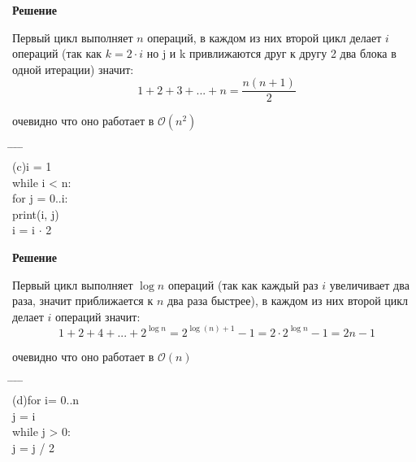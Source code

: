 \documentclass{article}
\begin{document}
\textbf{Решение}

Первый цикл выполняет $n$ операций, в каждом из них второй цикл делает $i$ операций (так как 
$k = 2\cdot i$ но j и k привлижаются друг к другу 2 два блока в одной итерации) значит:
\begin{equation*}
    1+2+3+...+n = \dfrac{n(n + 1)}{2}
\end{equation*}

очевидно что оно работает в $\mathcal{O}(n^2)$

\begin{tabbing}
    \hspace{0.5 cm} \= \hspace{0.5 cm}  \= \hspace{0.5 cm} \= \hspace{0.5 cm} \= \hspace{0.5 cm}\\
\> (c)i = 1\\
\>\>while i < n:\\
\>\>\>for j = 0..i:\\
\>\>\>\>print(i, j)\\
\>\>\>i = i $\cdot$  2
\end{tabbing}

\textbf{Решение}

Первый цикл выполняет $\log n$ операций (так как каждый раз $i$ увеличивает два раза, значит приближается к $n$ два раза быстрее),
 в каждом из них второй цикл делает $i$ операций значит:
\begin{equation*}
    1+2+4+...+2^{\log n} = 2^{\log (n) + 1} - 1 = 2\cdot 2^{\log n} - 1 = 2n - 1
\end{equation*}

очевидно что оно работает в $\mathcal{O}(n)$

\begin{tabbing}
    \hspace{0.5 cm} \= \hspace{0.5 cm}  \= \hspace{0.5 cm} \= \hspace{0.5 cm} \= \hspace{0.5 cm}\\
\> (d)for i= 0..n \\
\>\>j = i\\
\>\>\>while j > 0:\\
\>\>\>\>j = j / 2\\

\end{tabbing}
\end{document}
